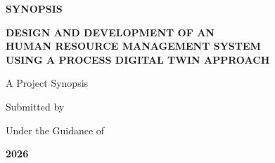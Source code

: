 \documentclass[12pt,a4paper]{article}
\begin{document}

\begin{titlepage}

\begin{center}

\vspace*{1cm}

{\Large \textbf{SYNOPSIS}}

\vspace{1.5cm}

{\LARGE
\textbf{DESIGN AND DEVELOPMENT OF AN}\\
\vspace{0.3cm}
\textbf{ HUMAN RESOURCE MANAGEMENT SYSTEM}\\
\vspace{0.3cm}
\textbf{USING A PROCESS DIGITAL TWIN APPROACH}
}

\vspace{2cm}

{\large
A Project Synopsis
}

\vspace{1.5cm}

Submitted by

\vspace{0.5cm}

\textbf{\underline{\hspace{7cm}}}

\vspace{0.7cm}

Under the Guidance of

\vspace{0.5cm}

\textbf{\underline{\hspace{7cm}}}

\vfill

\textbf{}

\vspace{0.4cm}

\textbf{\underline{\hspace{7cm}}}

\vspace{0.4cm}

\textbf{2026}

\end{center}

\end{titlepage}

\end{document}
